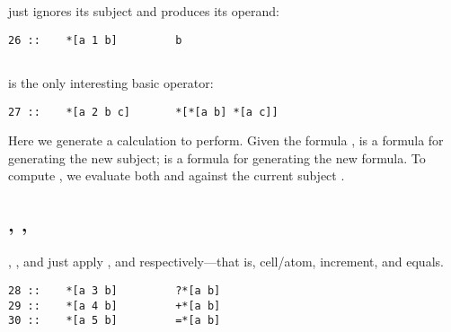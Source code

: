 \subsection{}

 just ignores its subject and produces its operand:

\begin{framed_shaded}
\begin{Verbatim}[fontsize=\relsize{-2.5},fontseries=b,commandchars=\\\{\}]
26 ::    *[a 1 b]         b
\end{Verbatim}
\end{framed_shaded}

\subsection{}

 is the only interesting basic operator:

\begin{framed_shaded}
\begin{Verbatim}[fontsize=\relsize{-2.5},fontseries=b,commandchars=\\\{\}]
27 ::    *[a 2 b c]       *[*[a b] *[a c]]
\end{Verbatim}
\end{framed_shaded}
Here we generate a calculation to perform.  Given the formula \kode{[2
b c]},  is a formula for generating the new subject;  is a
formula for generating the new formula.  To compute \kode{*[a 2 b c]},
we evaluate both  and  against the current subject .

\subsection{, , }

, , and  just apply , \kode{+} and \kode{=} respectively---that is, cell/atom, increment, and equals.

\begin{framed_shaded}
\begin{Verbatim}[fontsize=\relsize{-2.5},fontseries=b,commandchars=\\\{\}]
28 ::    *[a 3 b]         ?*[a b]
29 ::    *[a 4 b]         +*[a b]
30 ::    *[a 5 b]         =*[a b]
\end{Verbatim}
\end{framed_shaded}

